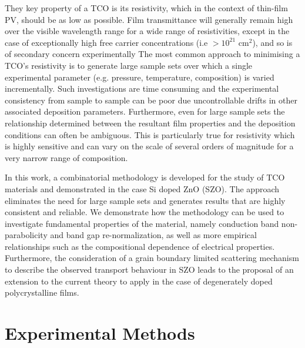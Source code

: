\documentclass[final,5p,times]{elsarticle}
\begin{document}
They key property of a TCO is its resistivity, which in the context of thin-film PV, should be as low as possible. Film transmittance will generally remain high over the visible wavelength range for a wide range of resistivities, except in the case of exceptionally high free carrier concentrations (i.e $>10^{21}$ cm$^2$), and so is of secondary concern experimentally The most common approach to minimising a TCO's resistivity is to generate large sample sets over which a single experimental parameter (e.g. pressure, temperature, composition)  is varied incrementally. Such investigations are time consuming and the experimental consistency from sample to sample can be poor due uncontrollable drifts in other associated deposition parameters. Furthermore, even for large sample sets the relationship determined between the resultant film properties and the deposition conditions can often be ambiguous. This is particularly true for resistivity which is highly sensitive and can vary on the scale of several orders of magnitude for a very narrow range of composition.

In this work, a combinatorial methodology is developed for the study of TCO materials and demonstrated in the case Si doped ZnO (SZO). The approach eliminates the need for large sample sets and generates results that are highly consistent and reliable. We demonstrate how the methodology can be used to investigate fundamental properties of the material, namely conduction band non-parabolicity and band gap re-normalization, as well as more empirical relationships such as the compositional dependence of electrical properties. Furthermore, the consideration of a grain boundary limited scattering mechanism to describe the observed transport behaviour in SZO leads to the proposal of an extension to the current theory to apply in the case of degenerately doped polycrystalline films.


\section{Experimental Methods}
\end{document}
